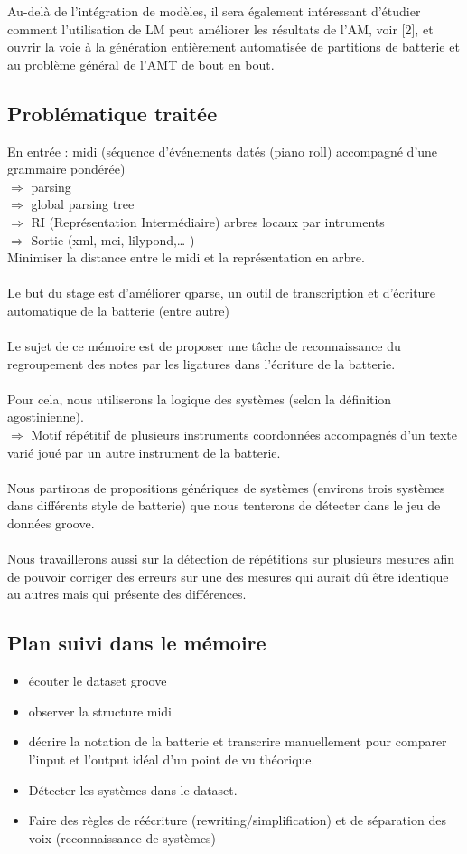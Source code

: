 Au-delà de l'intégration de modèles, il sera également intéressant d'étudier comment l'utilisation de LM peut améliorer les résultats de l'AM, voir [2], et ouvrir la voie à la génération entièrement automatisée de partitions de batterie et au problème général de l'AMT de bout en bout.
\cite{8350302}
\subsection*{Problématique traitée}	
	En entrée : midi (séquence d’événements datés (piano roll) accompagné d’une grammaire pondérée)\\
	$\Rightarrow$ parsing\\
	$\Rightarrow$ global parsing tree\\
	$\Rightarrow$ RI (Représentation Intermédiaire) arbres locaux par intruments\\
	$\Rightarrow$ Sortie (xml, mei, lilypond,… )\\
	Minimiser la distance entre le midi et la représentation en arbre.\\\\
	Le but du stage est d’améliorer qparse, un outil de transcription et d’écriture automatique de la batterie (entre autre)\\\\
	Le sujet de ce mémoire est de proposer une tâche de reconnaissance du regroupement des notes par les ligatures dans l’écriture de la batterie.\\\\
	Pour cela, nous utiliserons la logique des systèmes (selon la définition agostinienne).\\$\Rightarrow$ Motif répétitif de plusieurs instruments coordonnées accompagnés d’un texte varié joué par un autre instrument de la batterie.\\\\Nous partirons de propositions génériques de systèmes (environs trois systèmes dans différents style de batterie) que nous tenterons de détecter dans le jeu de données groove.\\\\
	Nous travaillerons aussi sur la détection de répétitions sur plusieurs mesures afin de pouvoir corriger des erreurs sur une des mesures qui aurait dû être identique au autres mais qui présente des différences.
	
\subsection*{Plan suivi dans le mémoire}
\begin{itemize}
	\item écouter le dataset groove
	\item observer la structure midi
	\item décrire la notation de la batterie et transcrire manuellement pour comparer l’input et l’output idéal d’un point de vu théorique.
	\item Détecter les systèmes dans le dataset.
	\item Faire des règles de réécriture (rewriting/simplification) et de séparation des voix (reconnaissance de systèmes)
\end{itemize}
	